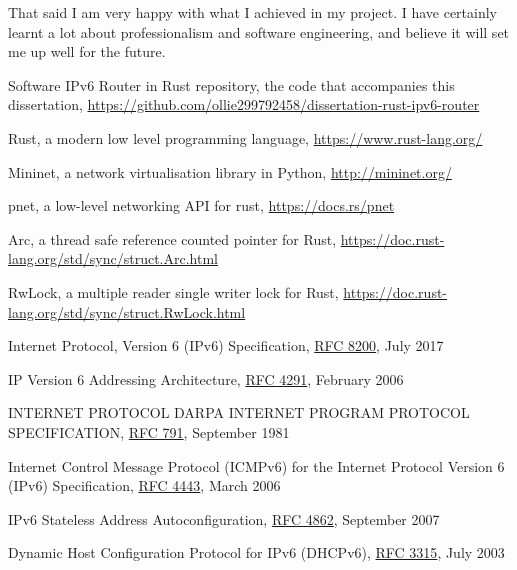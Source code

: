 \documentclass[12pt,a4paper,twoside,openright]{report}
\begin{document}
\bigskip

That said I am very happy with what I achieved in my project. I have certainly learnt a lot about professionalism and software engineering, and believe it will set me up well for the future.

\begin{thebibliography}{1}

 Software IPv6 Router in Rust repository, the code that accompanies this dissertation, \url{https://github.com/ollie299792458/dissertation-rust-ipv6-router}

 Rust, a modern low level programming language, \url{https://www.rust-lang.org/}

 Mininet, a network virtualisation library in Python, \url{http://mininet.org/}

 pnet, a low-level networking API for rust, \url{https://docs.rs/pnet}

 Arc, a thread safe reference counted pointer for Rust, \url{https://doc.rust-lang.org/std/sync/struct.Arc.html}

RwLock, a multiple reader single writer lock for Rust, \url{https://doc.rust-lang.org/std/sync/struct.RwLock.html}

 Internet Protocol, Version 6 (IPv6) Specification, \href{https://tools.ietf.org/html/rfc8200}{RFC 8200}, July 2017

 IP Version 6 Addressing Architecture, \href{https://tools.ietf.org/html/rfc4291}{RFC 4291}, February 2006

 INTERNET PROTOCOL DARPA INTERNET PROGRAM PROTOCOL SPECIFICATION, \href{https://tools.ietf.org/html/rfc791}{RFC 791}, September 1981

 Internet Control Message Protocol (ICMPv6) for the Internet Protocol Version 6 (IPv6) Specification, \href{https://tools.ietf.org/html/rfc4443}{RFC 4443}, March 2006

 IPv6 Stateless Address Autoconfiguration, \href{https://tools.ietf.org/html/rfc4862}{RFC 4862}, September 2007

 Dynamic Host Configuration Protocol for IPv6 (DHCPv6), \href{https://tools.ietf.org/html/rfc3315}{RFC 3315}, July 2003


\end{thebibliography}
\end{document}
